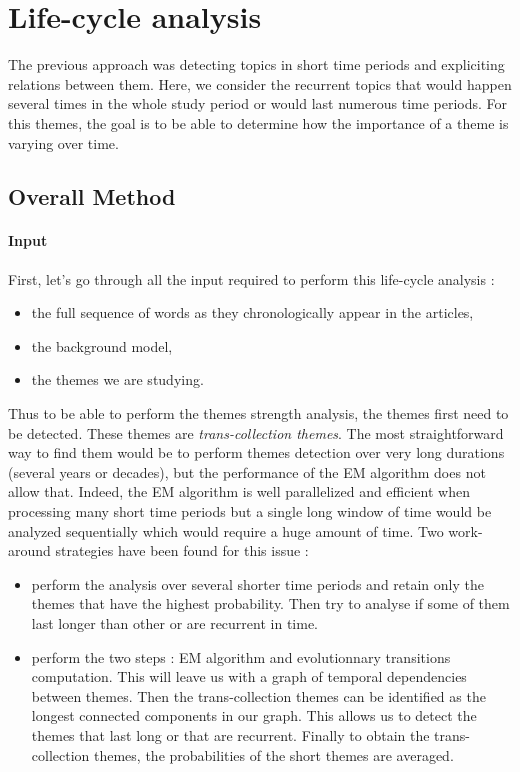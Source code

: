 \section{Life-cycle analysis}
The previous approach was detecting topics in short time periods and expliciting relations between them. Here, we consider the recurrent topics that would happen several times in the whole study period or would last numerous time periods. For this themes, the goal is to be able to determine how the importance of a theme is varying over time.

\subsection{Overall Method}

\paragraph{Input}
First, let's go through all the input required to perform this life-cycle analysis :
\begin{itemize}
\item the full sequence of words as they chronologically appear in the articles,
\item the background model,
\item the themes we are studying.

\end{itemize}

Thus to be able to perform the themes strength analysis, the themes first need to be detected. These themes are \emph{trans-collection themes}. The most straightforward way to find them would be to perform themes detection over very long durations (several years or decades), but the performance of the EM algorithm does not allow that. Indeed, the EM algorithm is well parallelized and efficient when processing many short time periods but a single long window of time would be analyzed sequentially which would require a huge amount of time. Two work-around strategies have been found for this issue :
\begin{itemize}
\item perform the analysis over several shorter time periods and retain only the themes that have the highest probability. Then try to analyse if some of them last longer than other or are recurrent in time.
\item perform the two steps  : EM algorithm and evolutionnary transitions computation. This will leave us with a graph of temporal dependencies between themes. Then the trans-collection themes can be identified as the longest connected components in our graph. This allows us to detect the themes that last long or that are recurrent. Finally to obtain the trans-collection themes, the probabilities of the short themes are averaged.
\end{itemize}

